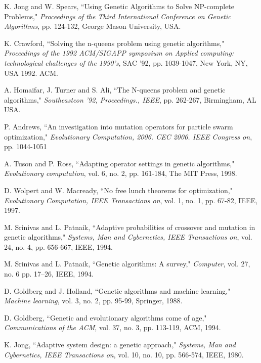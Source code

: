\documentclass[conference]{IEEEtran}
\begin{document}
\begin{thebibliography}{21}

 K. Jong and W. Spears, ``Using Genetic Algorithms to Solve NP-complete Problems,"
        {\it Proceedings of the Third International Conference on Genetic Algorithms}, pp. 124-132, George Mason University, USA.

 K. Crawford, ``Solving the n-queens problem using genetic algorithms,"
        {\it Proceedings of the 1992 ACM/SIGAPP symposium on Applied computing: technological challenges of the 1990's}, SAC '92, pp. 1039-1047, New York, NY, USA 1992. ACM.

 A. Homaifar, J. Turner and S. Ali, ``The N-queens problem and genetic algorithms," 
        {\it Southeastcon '92, Proceedings., IEEE}, pp. 262-267, Birmingham, AL USA.

 P. Andrews, ``An investigation into mutation operators for particle swarm optimization,"
        {\it Evolutionary Computation, 2006. CEC 2006. IEEE Congress on}, pp. 1044-1051

 A. Tuson and P. Ross, ``Adapting operator settings in genetic algorithms,"
        {\it Evolutionary computation}, vol. 6, no. 2, pp. 161-184, The MIT Press, 1998.

 D. Wolpert and W. Macready, ``No free lunch theorems for optimization,"
        {\it Evolutionary Computation, IEEE Transactions on}, vol. 1, no. 1, pp. 67-82, IEEE, 1997.

 M. Srinivas and L. Patnaik, ``Adaptive probabilities of crossover and mutation in genetic algorithms,"
        {\it Systems, Man and Cybernetics, IEEE Transactions on}, vol. 24, no. 4, pp. 656-667, IEEE, 1994.

 M. Srinivas and L. Patnaik, ``Genetic algorithms: A survey,"
        {\it Computer}, vol. 27, no. 6 pp. 17--26, IEEE, 1994.

 D. Goldberg and J. Holland, ``Genetic algorithms and machine learning,"
        {\it Machine learning}, vol. 3, no. 2, pp. 95-99, Springer, 1988.

 D. Goldberg, ``Genetic and evolutionary algorithms come of age,"
        {\it Communications of the ACM}, vol. 37, no. 3, pp. 113-119, ACM, 1994.

 K. Jong, ``Adaptive system design: a genetic approach,"
        {\it Systems, Man and Cybernetics, IEEE Transactions on}, vol. 10, no. 10, pp. 566-574, IEEE, 1980.


\end{thebibliography}
\end{document}
